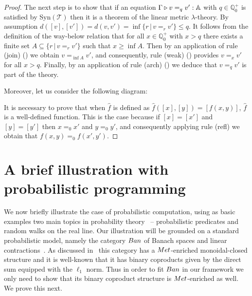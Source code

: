 \documentclass[a4paper,UKenglish,cleveref, autoref, thm-restate]{lipics-v2021}
\begin{document}
\begin{proof}
  The next step is to show that if an equation $\Gamma \triangleright v =_q v' : \mathbb{A}$ with $q \in \mathbb{Q}^{+}_0$ is satisfied by Syn$(\mathscr{T})$ then it is a theorem of the linear metric $\lambda$-theory. By assumption $d([v],[v']) = d(v,v') =  \inf{ \{r \, \vert \, v =_r v'\}} \leq q$. It follows from the definition of the way-below relation that for all
 $x \in \mathbb{Q}^{+}_0$ with $x>q$ there exists a finite set $A \subseteq \{r \, \vert \, v =_r v'\}$ such that $x \geq \inf{A}$. Then by an
 application of rule (join) (\cite[Figure 4]{dahlqvist2023syntactic}) we obtain $v =_{\inf{A}} v'$, and consequently, rule (weak) (\cite[Figure 4]{dahlqvist2023syntactic}) provides $v =_x v'$ for all $x > q$. Finally, by an application of rule (arch) (\cite[Figure 4]{dahlqvist2023syntactic}) we deduce that $v =_q v'$ is part of the theory.

  Moreover, let us consider the following diagram:

  \vspace{10pt}



It is necessary to prove that when $\hat{f}$ is defined as $\hat{f}([x],[y]) = [f(x,y)]$, $\hat{f}$ is a well-defined function. This is the case because if $[x] = [x']$ and $[y] = [y']$ then $x =_0 x'$ and $y =_0 y'$, and consequently applying rule  (refl) we obtain that $f(x,y) =_0 f(x',y')$.
\end{proof} 


\section{A brief illustration with probabilistic programming}

We now briefly illustrate the case of probabilistic computation, using as basic
examples two main topics in probability theory~\cite{dudley18} -- probabilistic
predicates and random walks on the real line.  Our illustration will be
grounded on a standard probabilistic model, namely the category $\Ban$ of
Banach spaces and linear contractions~\cite{dahlqvist19}. As discussed
in~\cite{dahlqvist2023syntactic} this category has a $\Met$-enriched
monoidal-closed structure and it is well-known that it has binary coproducts
given by the direct sum equipped with the $\ell_1$ norm. Thus in order to fit
$\Ban$ in our framework we only need to show that its binary coproduct
structure is $\Met$-enriched as well. We prove this next. 
\end{document}
